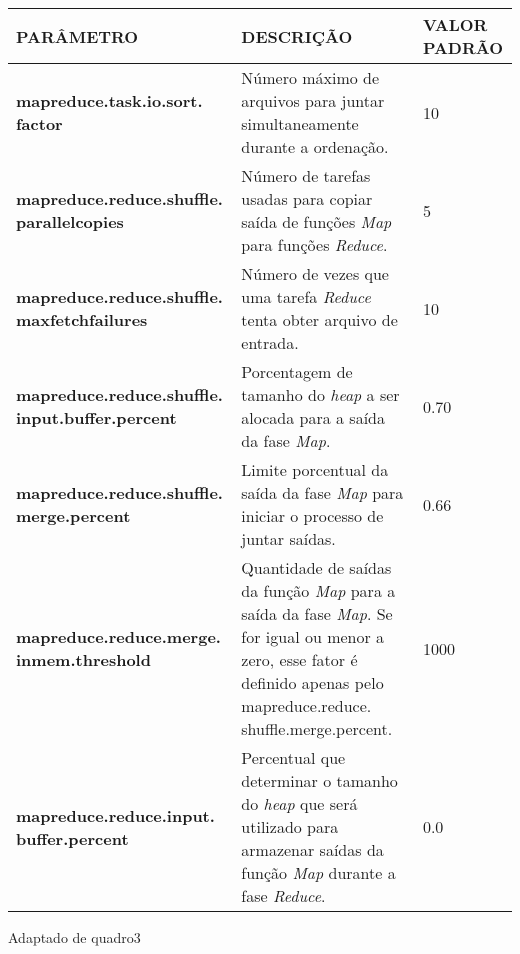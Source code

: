 {\footnotesize
  \centering
  \begin{tabular}{|p{40mm}|p{50mm}|p{30mm}|}\hline
    \textbf{PARÂMETRO}                                      & \textbf{DESCRIÇÃO}                                                                                                                                                                      & \textbf{VALOR PADRÃO} \\\hline
    \textbf{mapreduce.task.io.sort. factor}                 & Número máximo de arquivos para juntar simultaneamente durante a ordenação.                                                                                                              & 10                    \\\hline
    \textbf{mapreduce.reduce.shuffle. parallelcopies}       & Número de tarefas usadas para copiar saída de funções \textit{Map} para funções \textit{Reduce}.                                                                                        & 5                     \\\hline
    \textbf{mapreduce.reduce.shuffle. maxfetchfailures}     & Número de vezes que uma tarefa \textit{Reduce} tenta obter arquivo de entrada.                                                                                                          & 10                    \\\hline
    \textbf{mapreduce.reduce.shuffle. input.buffer.percent} & Porcentagem de tamanho do \textit{heap} a ser alocada para a saída da fase \textit{Map}.                                                                                                & 0.70                  \\\hline
    \textbf{mapreduce.reduce.shuffle. merge.percent}        & Limite porcentual da saída da fase \textit{Map} para iniciar o processo de juntar saídas.                                                                                               & 0.66                  \\\hline
    \textbf{mapreduce.reduce.merge. inmem.threshold}        & Quantidade de saídas da função \textit{Map} para a saída da fase \textit{Map}. Se for igual ou menor a zero, esse fator é definido apenas pelo mapreduce.reduce. shuffle.merge.percent. & 1000                  \\\hline
    \textbf{mapreduce.reduce.input. buffer.percent}         & Percentual que determinar o tamanho do \textit{heap} que será utilizado para armazenar saídas da função \textit{Map} durante a fase \textit{Reduce}.                                    & 0.0                   \\\hline
  \end{tabular}}
{Adaptado de \cite{HadoopBook15}}{quadro3}{}{}

